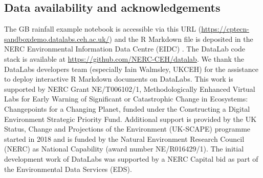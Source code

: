\hypertarget{data-availability-and-acknowledgements}{%
\subsection{Data availability and
acknowledgements}\label{data-availability-and-acknowledgements}}

The GB rainfall example notebook is accessible via this URL
(\url{https://cptecn-sandboxdemo.datalabs.ceh.ac.uk/}) and the R
Markdown file is deposited in the NERC Environmental Information Data
Centre (EIDC) \citep{EIDC}. The DataLab code stack is available at
\url{https://github.com/NERC-CEH/datalab}. We thank the DataLabs
developers team (especially Iain Walmsley, UKCEH) for the assistance to
deploy interactive R Markdown documents on DataLabs. This work is
supported by NERC Grant NE/T006102/1, Methodologically Enhanced Virtual
Labs for Early Warning of Significant or Catastrophic Change in
Ecosystems: Changepoints for a Changing Planet, funded under the
Constructing a Digital Environment Strategic Priority Fund. Additional
support is provided by the UK Status, Change and Projections of the
Environment (UK-SCAPE) programme started in 2018 and is funded by the
Natural Environment Research Council (NERC) as National Capability
(award number NE/R016429/1). The initial development work of DataLabs
was supported by a NERC Capital bid as part of the Environmental Data
Services (EDS).

